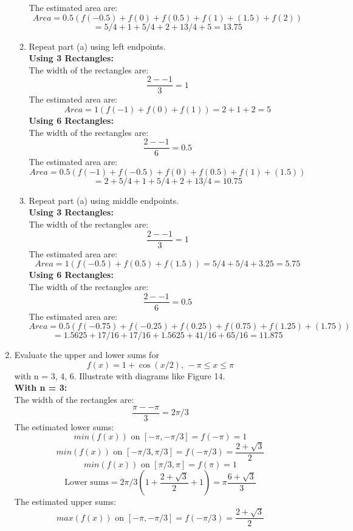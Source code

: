 \documentclass[12pt]{article}
\begin{document}
\begin{enumerate}
\begin{enumerate}
            The estimated area are:
            \[Area = 0.5(f(-0.5) + f(0) + f(0.5) + f(1) + (1.5) + f(2)) \]
            \[= 5/4 + 1 + 5/4 + 2 + 13/4 + 5 = 13.75\]
            \item Repeat part (a) using left endpoints.\\
            \textbf{Using 3 Rectangles:}\\
            The width of the rectangles are:
            \[\frac{2--1}{3} = 1\]
            The estimated area are:
            \[Area = 1(f(-1) + f(0) + f(1)) = 2 + 1 + 2 = 5\]
            \textbf{Using 6 Rectangles:}\\
            The width of the rectangles are:
            \[\frac{2--1}{6} = 0.5\]
            The estimated area are:
            \[Area = 0.5(f(-1) + f(-0.5) + f(0) + f(0.5) + f(1) + (1.5)) \]
            \[= 2 + 5/4 + 1 + 5/4 + 2 + 13/4 = 10.75\]
            \item Repeat part (a) using middle endpoints.\\
            \textbf{Using 3 Rectangles:}\\
            The width of the rectangles are:
            \[\frac{2--1}{3} = 1\]
            The estimated area are:
            \[Area = 1(f(-0.5) + f(0.5) + f(1.5)) = 5/4 + 5/4 + 3.25 = 5.75\]
            \textbf{Using 6 Rectangles:}\\
            The width of the rectangles are:
            \[\frac{2--1}{6} = 0.5\]
            The estimated area are:
            \[Area = 0.5(f(-0.75) + f(-0.25) + f(0.25) + f(0.75) + f(1.25) + (1.75))\]
            \[= 1.5625 + 17/16 + 17/16 + 1.5625 + 41/16 + 65/16 = 11.875\]
        \end{enumerate}
        \setcounter{enumi}{7}
        \item Evaluate the upper and lower sums for
        \[f(x) = 1 + \cos(x/2) \text{, } -\pi \leq x \leq \pi\]
        with n = 3, 4, 6. Illustrate with diagrams like Figure 14.\\
        \textbf{With n = 3:}\\
        The width of the rectangles are:
        \[\frac{\pi -- \pi}{3} = 2\pi/3\]
        The estimated lower sums:
        \[min(f(x))\text{ on }[-\pi, -\pi/3] = f(-\pi) = 1\]
        \[min(f(x))\text{ on }[-\pi/3, \pi/3] = f(-\pi/3) = \frac{2 + \sqrt{3}}{2}\]
        \[min(f(x))\text{ on }[\pi/3, \pi] = f(\pi) = 1\] 
        \[\text{Lower sums} = 2\pi/3 (1 + \frac{2 + \sqrt{3}}{2} + 1) = \pi\frac{6+\sqrt{3}}{3} \]
        The estimated upper sums:
        \[max(f(x))\text{ on }[-\pi, -\pi/3] = f(-\pi/3) = \frac{2 + \sqrt{3}}{2}\]

\end{enumerate}
\end{document}
